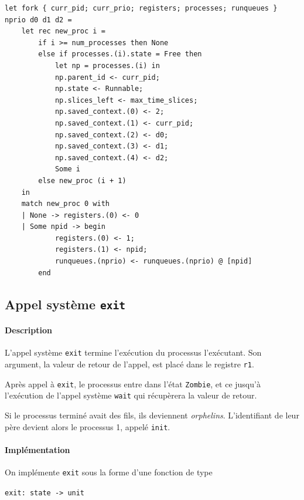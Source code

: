 \documentclass[french, toc]{../cs-classes/cs-classes}
\begin{document}
\begin{verbatim}
let fork { curr_pid; curr_prio; registers; processes; runqueues } nprio d0 d1 d2 =
    let rec new_proc i =
        if i >= num_processes then None
        else if processes.(i).state = Free then
            let np = processes.(i) in
            np.parent_id <- curr_pid;
            np.state <- Runnable;
            np.slices_left <- max_time_slices;
            np.saved_context.(0) <- 2;
            np.saved_context.(1) <- curr_pid;
            np.saved_context.(2) <- d0;
            np.saved_context.(3) <- d1;
            np.saved_context.(4) <- d2;
            Some i
        else new_proc (i + 1)
    in
    match new_proc 0 with
    | None -> registers.(0) <- 0
    | Some npid -> begin
            registers.(0) <- 1;
            registers.(1) <- npid;
            runqueues.(nprio) <- runqueues.(nprio) @ [npid]
        end
\end{verbatim}

\subsection{Appel système \texttt{exit}}
\paragraph*{Description} 
L'appel système \texttt{exit} termine l'exécution du processus l'exécutant. Son argument, la valeur de retour de l'appel, est placé dans le registre \texttt{r1}.

Après appel à \texttt{exit}, le processus entre dans l'état \texttt{Zombie}, et ce jusqu'à l'exécution de l'appel système \texttt{wait} qui récupèrera la valeur de retour.

Si le processus terminé avait des fils, ils deviennent \emph{orphelins}. L'identifiant de leur père devient alors le processus 1, appelé \texttt{init}.

\paragraph*{Implémentation} On implémente \texttt{exit} sous la forme d'une fonction de type
\begin{center}
    \texttt{exit: state -> unit}
\end{center}
\end{document}
